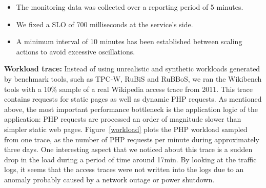 \begin{itemize}

\item The monitoring data was collected over a reporting period of 5 minutes.

\item We fixed a SLO of 700 milliseconds at the service's side.



\item A minimum interval of 10 minutes has been established between scaling actions to avoid excessive oscillations. 
\end{itemize}




\textbf{Workload trace:}  Instead of using unrealistic and synthetic workloads generated by benchmark tools, such as TPC-W, RuBiS and RuBBoS, we ran the Wikibench tools with a 10\% sample of a real Wikipedia access trace from 2011.  This trace contains requests for static pages as well as dynamic PHP requests. As mentioned above, the most important performance bottleneck is the application logic of the application: PHP requests are processed an order of magnitude slower than simpler static web pages. Figure~\ref{workload} plots the PHP workload sampled from one trace, as the number of PHP requests per minute during approximately three days. One interesting aspect that we noticed about this trace is a sudden drop in the load during a period of time around 17min. By looking at the traffic logs, it seems that the access traces were not written into the logs due to an anomaly probably caused by a network outage or power shutdown. 

